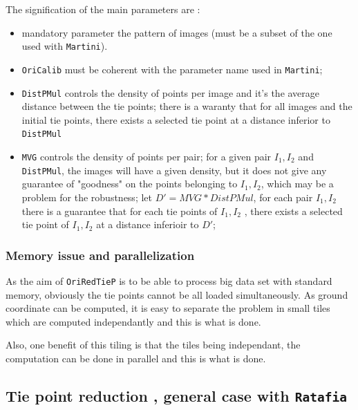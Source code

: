 The signification of the main parameters are :

\begin{itemize}
   \item mandatory parameter the pattern of images (must be a subset of the one used with {\tt Martini}).
   \item  {\tt OriCalib} must be coherent with the parameter name used in {\tt Martini};
   \item  {\tt DistPMul} controls the density of points per image and it's the average distance between the
          tie points; there is a waranty that for all images and the initial tie points, there exists
          a selected tie point at a distance inferior to  {\tt DistPMul}
   \item  {\tt MVG} controls the density of points per pair; for a given pair $I_1,I_2$ and 
          {\tt DistPMul}, the images will have a given density, but it does not give any guarantee of "goodness"
          on the points belonging to $I_1,I_2$, which may be a problem for the robustness;
          let $D'=MVG*DistPMul$, for each pair $I_1,I_2$   there is a guarantee 
          that for each tie points of $I_1,I_2$ , there exists
          a selected tie point of $I_1,I_2$ at a distance inferioir to  $D'$;
\end{itemize}



\subsubsection{Memory issue and parallelization}


As the aim of {\tt OriRedTieP} is to be able to process big data set with standard memory,
obviously the tie points cannot be all loaded simultaneously. As ground coordinate can be
computed, it is easy to separate the problem in small tiles which are computed independantly
and this is what is done.

Also, one benefit of this tiling is that the tiles being independant, the computation can
be done in parallel and this is what is done.



\subsection{Tie point reduction , general case with {\tt Ratafia}}


